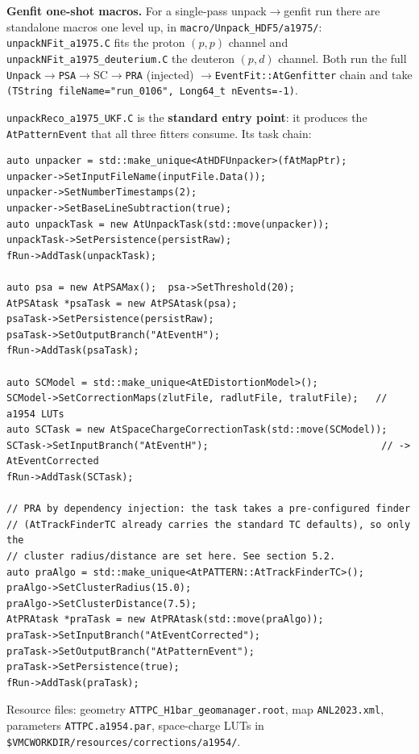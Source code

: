 \documentclass[11pt,a4paper]{article}
\newcommand{\code}[1]{\texttt{\small #1}}
\newcommand{\file}[1]{\texttt{\small #1}}
\begin{document}
\begin{notebox}
\textbf{Genfit one-shot macros.} For a single-pass unpack$\rightarrow$genfit run
there are standalone macros one level up, in \file{macro/Unpack\_HDF5/a1975/}:
\file{unpackNFit\_a1975.C} fits the proton $(p,p)$ channel and
\file{unpackNFit\_a1975\_deuterium.C} the deuteron $(p,d)$ channel. Both run the
full \code{Unpack}$\rightarrow$\code{PSA}$\rightarrow$SC$\rightarrow$\code{PRA}
(injected) $\rightarrow$\code{EventFit::AtGenfitter} chain and take
\code{(TString fileName="run\_0106", Long64\_t nEvents=-1)}.
\end{notebox}

\code{unpackReco\_a1975\_UKF.C} is the \textbf{standard entry point}: it produces
the \code{AtPatternEvent} that all three fitters consume. Its task chain:

\begin{lstlisting}
auto unpacker = std::make_unique<AtHDFUnpacker>(fAtMapPtr);
unpacker->SetInputFileName(inputFile.Data());
unpacker->SetNumberTimestamps(2);
unpacker->SetBaseLineSubtraction(true);
auto unpackTask = new AtUnpackTask(std::move(unpacker));
unpackTask->SetPersistence(persistRaw);
fRun->AddTask(unpackTask);

auto psa = new AtPSAMax();  psa->SetThreshold(20);
AtPSAtask *psaTask = new AtPSAtask(psa);
psaTask->SetPersistence(persistRaw);
psaTask->SetOutputBranch("AtEventH");
fRun->AddTask(psaTask);

auto SCModel = std::make_unique<AtEDistortionModel>();
SCModel->SetCorrectionMaps(zlutFile, radlutFile, tralutFile);   // a1954 LUTs
auto SCTask = new AtSpaceChargeCorrectionTask(std::move(SCModel));
SCTask->SetInputBranch("AtEventH");                              // -> AtEventCorrected
fRun->AddTask(SCTask);

// PRA by dependency injection: the task takes a pre-configured finder
// (AtTrackFinderTC already carries the standard TC defaults), so only the
// cluster radius/distance are set here. See section 5.2.
auto praAlgo = std::make_unique<AtPATTERN::AtTrackFinderTC>();
praAlgo->SetClusterRadius(15.0);
praAlgo->SetClusterDistance(7.5);
AtPRAtask *praTask = new AtPRAtask(std::move(praAlgo));
praTask->SetInputBranch("AtEventCorrected");
praTask->SetOutputBranch("AtPatternEvent");
praTask->SetPersistence(true);
fRun->AddTask(praTask);
\end{lstlisting}

Resource files: geometry \file{ATTPC\_H1bar\_geomanager.root}, map
\file{ANL2023.xml}, parameters \file{ATTPC.a1954.par}, space-charge LUTs in
\file{\$VMCWORKDIR/resources/corrections/a1954/}.
\end{document}
